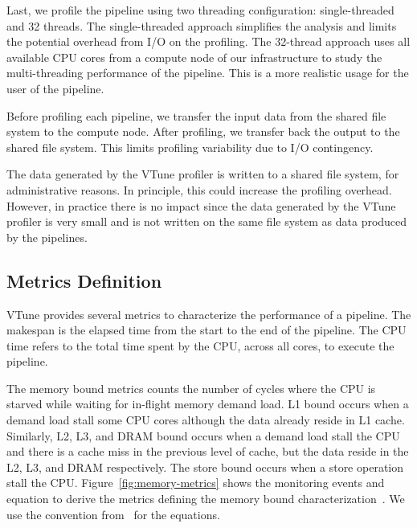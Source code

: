 \documentclass[conference]{IEEEtran}
\begin{document}
\begin{minipage}{\linewidth}
	
\end{minipage}
			
Last, we profile the pipeline using two threading configuration: single-threaded and 32 threads. The single-threaded approach simplifies the analysis and limits the potential overhead from I/O on the profiling. 
The 32-thread approach uses all available CPU cores from a compute node of our infrastructure to study the multi-threading performance of the pipeline. This is a more realistic usage for the user of the pipeline.
			
Before profiling each pipeline, we transfer the input data from the shared file system to the compute node. After profiling, we transfer back the output to the shared file system. This limits profiling variability due to I/O contingency.
			
The data generated by the VTune profiler is written to a shared file system, for administrative reasons. In principle, this could increase the profiling overhead. However, in practice there is no impact since the data generated by the VTune profiler is very small and is not written on the same file system as data produced by the pipelines.
			
\subsection{Metrics Definition}
VTune provides several metrics to characterize the performance of a pipeline.  The makespan is the elapsed time from the start to the end of the pipeline. The CPU time refers to the total time spent by the CPU, across all cores, to execute the pipeline. 

The memory bound metrics counts the number of cycles where the CPU is starved while waiting for in-flight memory demand load. L1 bound occurs when a demand load stall some CPU cores although the data already reside in L1 cache. Similarly, L2, L3, and DRAM bound occurs when a demand load stall the CPU and there is a cache miss in the previous level of cache, but the data reside in the L2, L3, and DRAM respectively. The store bound occurs when a store operation stall the CPU. Figure~\ref{fig:memory-metrics} shows the monitoring events and equation to derive the metrics defining the memory bound characterization~\cite{Intel2006-lc}. We use the convention from~\cite{Kukunas2015-jd} for the equations.
			
\end{document}
